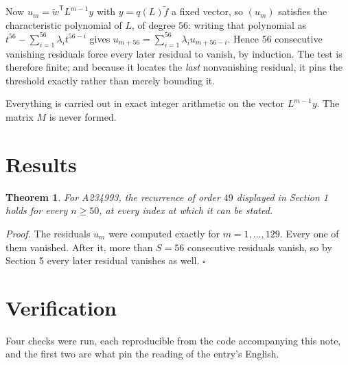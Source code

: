 \documentclass[11pt]{article}
\newtheorem{theorem}{Theorem}
\theoremstyle{definition}
\begin{document}
Now $u_m = \tilde w^{\mathsf T} L^{m-1} y$ with $y = q(L)\tilde f$ a fixed vector, so $(u_m)$ satisfies the characteristic polynomial of $L$, of degree $56$: writing that polynomial as $t^{56} - \sum_{i=1}^{56} \lambda_i t^{56-i}$ gives $u_{m+56} = \sum_{i=1}^{56} \lambda_i u_{m+56-i}$. Hence $56$ consecutive vanishing residuals force every later residual to vanish, by induction. The test is therefore finite; and because it locates the {\itshape last} nonvanishing residual, it pins the threshold exactly rather than merely bounding it.

Everything is carried out in exact integer arithmetic on the vector $L^{m-1}y$. The matrix $M$ is never formed.

\section{Results}

\begin{theorem} For A234993, the recurrence of order $49$ displayed in Section 1 holds for every $n \ge 50$, at every index at which it can be stated.\end{theorem}

{\itshape Proof.} The residuals $u_m$ were computed exactly for $m = 1,\dots,129$. Every one of them vanished. After it, more than $S = 56$ consecutive residuals vanish, so by Section 5 every later residual vanishes as well. $\square$

\section{Verification}

Four checks were run, each reproducible from the code accompanying this note, and the first two are what pin the reading of the entry's English.
\end{document}
